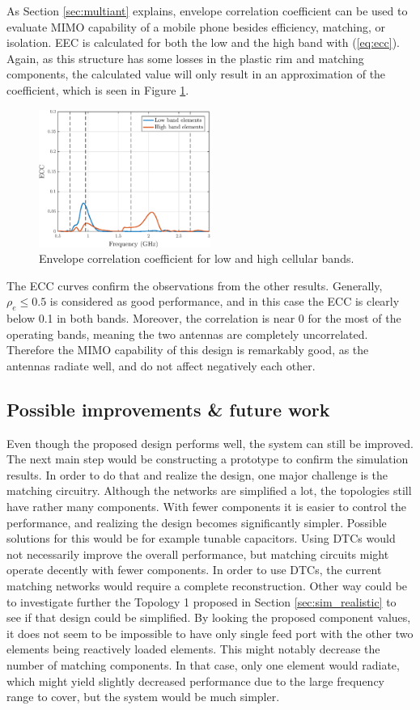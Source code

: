 As Section \ref{sec:multiant} explains, envelope correlation coefficient can be used to evaluate MIMO capability of a mobile phone besides efficiency, matching, or isolation. EEC is calculated for both the low and the high band with (\ref{eq:ecc}). Again, as this structure has some losses in the plastic rim and matching components, the calculated value will only result in an approximation of the coefficient, which is seen in Figure \ref{fig:ecc}. 
\begin{figure}[H]
    \centering
    \includegraphics[width=0.5\textwidth]{img/ecc.eps}
    \caption{Envelope correlation coefficient for low and high cellular bands.}
    \label{fig:ecc}
\end{figure}

The ECC curves confirm the observations from the other results. Generally, $\rho_e\leq0.5$ is considered as good performance, and in this case the ECC is clearly below 0.1 in both bands. Moreover, the correlation is near 0 for the most of the operating bands, meaning the two antennas are completely uncorrelated. Therefore the MIMO capability of this design is remarkably good, as the antennas radiate well, and do not affect negatively each other.

\subsection{Possible improvements \& future work}
\label{sec:improvements}
Even though the proposed design performs well, the system can still be improved. The next main step would be constructing a prototype to confirm the simulation results. In order to do that and realize the design, one major challenge is the matching circuitry. Although the networks are simplified a lot, the topologies still have rather many components. With fewer components it is easier to control the performance, and realizing the design becomes significantly simpler. Possible solutions for this would be for example tunable capacitors. Using DTCs would not necessarily improve the overall performance, but matching circuits might operate decently with fewer components. In order to use DTCs, the current matching networks would require a complete reconstruction. Other way could be to investigate further the Topology 1 proposed in Section \ref{sec:sim_realistic} to see if that design could be simplified. By looking the proposed component values, it does not seem to be impossible to have only single feed port with the other two elements being reactively loaded elements. This might notably decrease the number of matching components. In that case, only one element would radiate, which might yield slightly decreased performance due to the large frequency range to cover, but the system would be much simpler.

